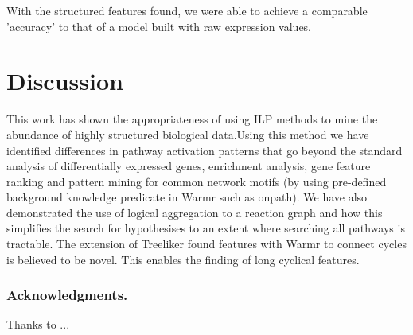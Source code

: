 \documentclass[runningheads,a4paper]{llncs}
\begin{document}
With the structured features found, we were able to achieve a comparable 'accuracy' to that of a model built with raw expression values. 

\section{Discussion}
This work has shown the appropriateness of using ILP methods to mine the abundance of highly structured biological data.Using this method we have identified differences in pathway activation patterns that go beyond the standard analysis of differentially expressed genes, enrichment analysis, gene feature ranking and pattern mining for common network motifs (by using pre-defined background knowledge predicate in Warmr such as onpath). We have also demonstrated the use of logical aggregation to a  reaction graph and how this simplifies the search for hypothesises to an extent where searching all pathways is tractable. The extension of Treeliker found features with Warmr to connect cycles is believed to be novel. This enables the finding of long cyclical features. 



\subsubsection*{Acknowledgments.} Thanks to ...




{}
%

%
%
\end{document}

